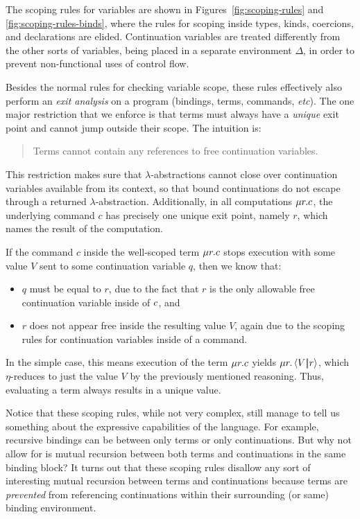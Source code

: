 \documentclass{article}
\begin{document}
The scoping rules for variables are shown in Figures~\ref{fig:scoping-rules} and
\ref{fig:scoping-rules-binds}, where the rules for scoping inside types, kinds,
coercions, and declarations are elided.  Continuation variables are treated
differently from the other sorts of variables, being placed in a separate
environment $\Delta$, in order to prevent non-functional uses of control flow.

Besides the normal rules for checking variable scope, these rules effectively
also perform an \emph{exit analysis} on a program (bindings, terms, commands,
\emph{etc}).  The one major restriction that we enforce is that terms must
always have a \emph{unique} exit point and cannot jump outside their scope.  The
intuition is:
\begin{quote}
  Terms cannot contain any references to free continuation variables.
\end{quote}
This restriction makes sure that $\lambda$-abstractions cannot close over
continuation variables available from its context, so that bound continuations
do not escape through a returned $\lambda$-abstraction.  Additionally, in all
computations $\mu{r}.c$, the underlying command $c$ has precisely one unique
exit point, namely $r$, which names the result of the computation.

If the command $c$ inside the well-scoped term $\mu{r}.c$ stops execution
with some value $V$ sent to some continuation variable $q$, then we know that:
\begin{itemize}
\item $q$ must be equal to $r$, due to the fact that $r$ is the only allowable
  free continuation variable inside of $c$, and
\item $r$ does not appear free inside the resulting value $V$, again due to the
  scoping rules for continuation variables inside of a command.
\end{itemize}
In the simple case, this means execution of the term $\mu{r}.c$ yields
$\mu{r}.\left\langle{V}\middle|\!\middle|{r}\right\rangle$, which $\eta$-reduces to just the value $V$ by the
previously mentioned reasoning.  Thus, evaluating a term always results in a
unique value.

Notice that these scoping rules, while not very complex, still manage to tell us
something about the expressive capabilities of the language.  For example,
recursive bindings can be between only terms or only continuations.  But why not
allow for is mutual recursion between both terms and continuations in the same
binding block?  It turns out that these scoping rules disallow any sort of
interesting mutual recursion between terms and continuations because terms are
\emph{prevented} from referencing continuations within their surrounding (or
same) binding environment.
\end{document}

